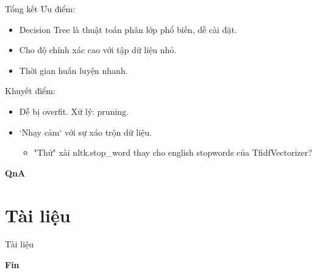 \documentclass[aspectratio=169,xcolor=dvipsnames]{beamer}
\begin{document}
\begin{frame}{Tổng kết}
Ưu điểm:
\begin{itemize}
\item Decision Tree là thuật toán phân lớp phổ biến, dễ cài đặt.
\item Cho độ chính xác cao với tập dữ liệu nhỏ.
\item Thời gian huấn luyện nhanh.
\end{itemize}
Khuyết điểm:
\begin{itemize}
\item Dễ bị overfit. Xử lý: pruning.
\item `Nhạy cảm` với sự xáo trộn dữ liệu.\cite{Kowsari_2019}
\begin{itemize}
	\item "Thử" xài nltk.stop\_word thay cho english stopwords của TfidfVectorizer?
\end{itemize}
\end{itemize}
\end{frame}

\begin{frame}
    \Huge{\centerline{\textbf{QnA}}}
\end{frame}

\section{Tài liệu}

\begin{frame}{Tài liệu}
    \printbibliography
\end{frame}

\begin{frame}
    \Huge{\centerline{\textbf{Fin}}}
\end{frame}
\end{document}
